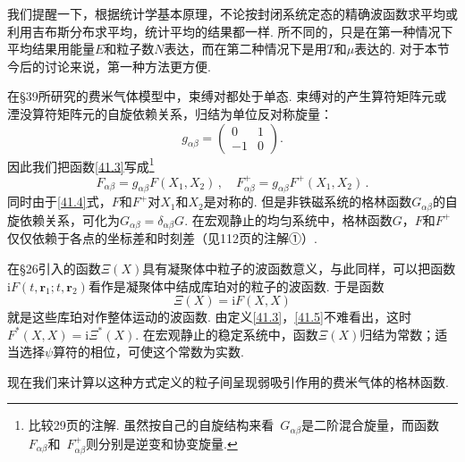 我们提醒一下，根据统计学基本原理，不论按封闭系统定态的精确波函数求平均或利用吉布斯分布求平均，统计平均的结果都一样. 所不同的，只是在第一种情况下平均结果用能量$E$和粒子数$N$表达，而在第二种情况下是用$T$和$\mu$表达的. 对于本节今后的讨论来说，第一种方法更方便.

在§39所研究的费米气体模型中，束缚对都处于单态. 束缚对的产生算符矩阵元或湮没算符矩阵元的自旋依赖关系，归结为单位反对称旋量：
\begin{equation}
g_{\alpha\beta} = \begin{pmatrix} 0 & 1 \\ -1 & 0 \end{pmatrix}.
\label{41.5}
\end{equation}
因此我们把函数\eqref{41.3}写成\footnote{比较29页的注解. 虽然按自己的自旋结构来看~$G_{\alpha\beta}$是二阶混合旋量，而函数~$F_{\alpha\beta}$和~$F^{+}_{\alpha\beta}$则分别是逆变和协变旋量.}
\begin{equation}
F_{\alpha\beta} = g_{\alpha\beta}F(X_1,X_2)\,,\quad F^{+}_{\alpha\beta} = g_{\alpha\beta}F^{+}(X_1,X_2)\,.
\label{41.6}
\end{equation}
同时由于\eqref{41.4}式，$F$和$F^{+}$对$X_1$和$X_2$是对称的. 但是非铁磁系统的格林函数$G_{\alpha\beta}$的自旋依赖关系，可化为$G_{\alpha\beta}=\delta_{\alpha\beta}G$. 在宏观静止的均匀系统中，格林函数$G$，$F$和$F^{+}$仅仅依赖于各点的坐标差和时刻差（见112页的注解①）.

在§26引入的函数$\Xi(X)$具有凝聚体中粒子的波函数意义，与此同样，可以把函数$\mathrm iF(t,\bm r_1;t,\bm r_2)$看作是凝聚体中结成库珀对的粒子的波函数. 于是函数
\begin{equation}
\Xi(X) = \mathrm iF(X,X)
\label{41.7}
\end{equation}
就是这些库珀对作整体运动的波函数. 由定义\eqref{41.3}，\eqref{41.5}不难看出，这时$F^{*}(X,X)=\mathrm i\Xi^{*}(X)$. 在宏观静止的稳定系统中，函数$\Xi(X)$归结为常数；适当选择$\psi$算符的相位，可使这个常数为实数.

现在我们来计算以这种方式定义的粒子间呈现弱吸引作用的费米气体的格林函数.

